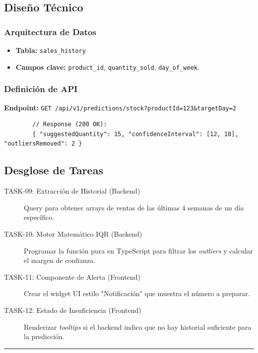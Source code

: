 \documentclass[11pt, letterpaper]{article}
\begin{document}
    \subsection{Diseño Técnico}
    \subsubsection*{Arquitectura de Datos}
    \begin{itemize}
        \item \textbf{Tabla:} \texttt{sales\_history}
        \item \textbf{Campos clave:} \texttt{product\_id}, \texttt{quantity\_sold}, \texttt{day\_of\_week}.
    \end{itemize}

    \subsubsection*{Definición de API}
    \textbf{Endpoint:} \texttt{GET /api/v1/predictions/stock?productId=123\&targetDay=2}
    \begin{verbatim}
        // Response (200 OK):
        { "suggestedQuantity": 15, "confidenceInterval": [12, 18], "outliersRemoved": 2 }
    \end{verbatim}

    \subsection{Desglose de Tareas}
    \begin{description}
        \item[TASK-09: Extracción de Historial (Backend)] Query para obtener arrays de ventas de las últimas 4 semanas de un día específico.
        \item[TASK-10: Motor Matemático IQR (Backend)] Programar la función pura en TypeScript para filtrar los \textit{outliers} y calcular el margen de confianza.
        \item[TASK-11: Componente de Alerta (Frontend)] Crear el widget UI estilo "Notificación" que muestra el número a preparar.
        \item[TASK-12: Estado de Insuficiencia (Frontend)] Renderizar \textit{tooltips} si el backend indica que no hay historial suficiente para la predicción.
    \end{description}

    \vspace{1em}
    \hrule
    \vspace{2em}
\end{document}
